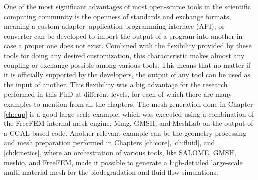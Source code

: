 
One of the most significant advantages of most open-source tools in the scientific computing community is the openness of standards and exchange formats, meaning a custom adapter, application programming interface (\gls{API}), or converter can be developed to import the output of a program into another in case a proper one does not exist. Combined with the flexibility provided by these tools for doing any desired customization, this characteristic makes almost any coupling or exchange possible among various tools. This means that no matter if it is officially supported by the developers, the output of any tool can be used as the input of another. This flexibility was a big advantage for the research performed in this PhD at different levels, for each of which there are many examples to mention from all the chapters. The mesh generation done in Chapter \ref{ch:cup} is a good large-scale example, which was executed using a combination of the FreeFEM internal mesh engine, Mmg, GMSH, and MeshLab on the output of a CGAL-based code. Another relevant example can be the geometry processing and mesh preparation performed in Chapters \ref{ch:core}, \ref{ch:fluid}, and \ref{ch:kinetics}, where an orchestration of various tools, like SALOME, GMSH, meshio, and FreeFEM, made it possible to generate a high-detailed large-scale multi-material mesh for the biodegradation and fluid flow simulations.

